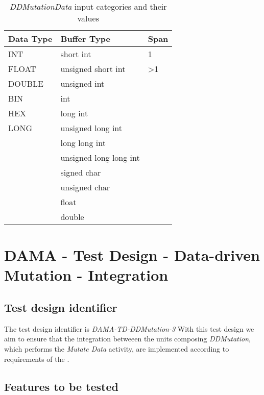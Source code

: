 \begin{table}[h]
  \scriptsize
  \centering
  \caption{\emph{DDMutationData} input categories and their values}
  \label{table:ddmutation2_categories}
\begin{tabular}{@{}lll@{}}
\toprule
\textbf{Data Type} & \textbf{Buffer Type}   & \textbf{Span}   \\ \midrule
INT                & short int              & 1               \\
FLOAT              & unsigned short int     & \textgreater{}1 \\
DOUBLE             & unsigned int           &                 \\
BIN                & int                    &                 \\
HEX                & long int               &                 \\
LONG               & unsigned long int      &                 \\
                   & long long int          &                 \\
                   & unsigned long long int &                 \\
                   & signed char            &                 \\
                   & unsigned char          &                 \\
                   & float                  &                 \\
                   & double                 &                 \\ \bottomrule
\end{tabular}
\end{table}


\section{DAMA - Test Design - Data-driven Mutation - Integration}

\subsection{Test design identifier}
%
The test design identifier is \emph{DAMA-TD-DDMutation-3}
%
With this test design we aim to ensure that the integration betweeen the units composing \emph{DDMutation}, which performs the \emph{Mutate Data} activity, are implemented according to requirements of the \FAQAS.
%
\subsection{Features to be tested}

